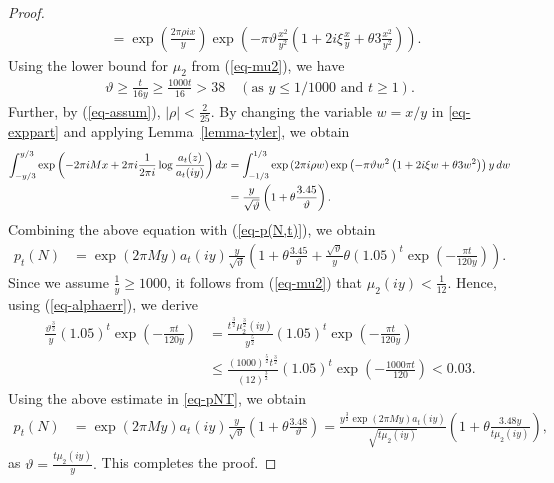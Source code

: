 \documentclass[10pt,a4paper]{amsart}
\numberwithin{equation}{section}
\begin{document}
\begin{proof}
\begin{align}
			&=\exp\left(\frac{2\pi\rho ix}{y}\right)\exp\left(-\pi\vartheta\frac{x^{2}}{y^{2}}\left(1+2i\xi\frac{x}{y}+\theta 3\frac{x^{2}}{y^{2}}\right)\right).
		\end{align}
		Using the lower bound for $\mu_2$ from (\ref{eq-mu2}), we have
		\begin{align*}
			\vartheta\ge \frac{t}{16y}\ge \frac{1000t}{16}>38 \quad\left(\text{as $y\le 1/1000$ and $t\ge 1$}\right).
		\end{align*}
		Further, by (\ref{eq-assum}), $|\rho|<\frac{2}{25}$. By changing the variable $w=x/y$ in \eqref{eq-exppart} and applying Lemma~\ref{lemma-tyler}, we obtain
		\begin{align*}
			\notag
			\int_{-y/3}^{y/3}\exp\left(-2\pi i Mx+2\pi i\frac{1}{2\pi i}\log\frac{a_{t}(z)}{a_{t}(iy)}\right)dx&=\int_{-1/3}^{1/3}\exp\left(2\pi i\rho w\right)\exp\left(-\pi\vartheta w^{2}\left(1+2i\xi w+\theta 3w^{2}\right)\right)y\,dw\\
			&=\frac{y}{\sqrt{\vartheta}}\left(1+\theta\frac{3.45}{\vartheta}\right).
		\end{align*}
		Combining the above equation with (\ref{eq-p(N,t)}), we obtain 
		\begin{align}\label{eq-pNT}
			p_t(N) &=\exp(2\pi My)a_{t}(iy)\frac{y}{\sqrt{\vartheta}}\left(1+\theta\frac{3.45}{\vartheta}+\frac{\sqrt{\vartheta}}{y}\theta(1.05)^{t}\exp\left(-\frac{\pi t}{120y}\right)\right).
		\end{align}
		Since we assume $\frac{1}{y} \ge 1000$, it follows from (\ref{eq-mu2}) that $\mu_2(iy) < \frac{1}{12}$. Hence, using (\ref{eq-alphaerr}), we derive
		\begin{align*}
			\frac{\vartheta^{\frac{3}{2}}}{y}(1.05)^{t}\exp\left(-\frac{\pi t}{120y}\right)&= \frac{t^{\frac{3}{2}}\mu^{\frac{3}{2}}_2(iy)}{y^{\frac{5}{2}}}(1.05)^{t}\exp\left(-\frac{\pi t}{120y}\right)\\
			&\le \frac{(1000)^{\frac{5}{2}}t^{\frac{3}{2}}}{(12)^{\frac{3}{2}}}(1.05)^{t}\exp\left(-\frac{1000\pi t}{120}\right)<0.03.
		\end{align*}
		Using the above estimate in \eqref{eq-pNT}, we obtain
		\begin{align*}
			p_t(N)&=\exp\left(2\pi My\right)a_t(iy)\frac{y}{\sqrt{\vartheta}}\left(1+\theta\frac{3.48}{\vartheta}\right)
			=\frac{y^{\frac{3}{2}}\exp(2\pi My)a_{t}(iy)}{\sqrt{t\mu_{2}(iy)}}\left(1+\theta\frac{3.48y}{t\mu_2(iy)}\right),    
		\end{align*} 
		as $\vartheta=\frac{t\mu_{2}(iy)}{y}.$
		This completes the proof.
	\end{proof}
\end{document}

